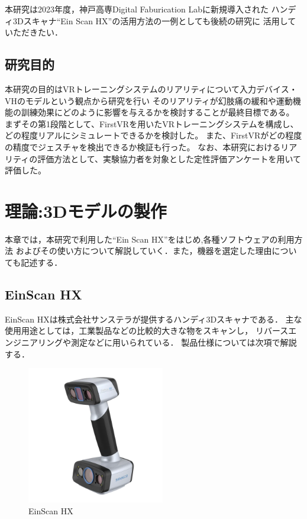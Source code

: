 \documentclass{ltjsreport}
\begin{document}
	本研究は2023年度，神戸高専Digital Faburication Labに新規導入された
	ハンディ3Dスキャナ``Ein Scan HX''\cite{ref:6}の活用方法の一例としても後続の研究に
	活用していただきたい．

	\section{研究目的}
	本研究の目的はVRトレーニングシステムのリアリティについて入力デバイス・VHのモデルという観点から研究を行い
	そのリアリティが幻肢痛の緩和や運動機能の訓練効果にどのように影響を与えるかを検討することが最終目標である。
	まずその第1段階として、FirstVRを用いたVRトレーニングシステムを構成し、どの程度リアルにシミュレートできるかを検討した。
	また、FirstVRがどの程度の精度でジェスチャを検出できるか検証も行った。
	なお、本研究におけるリアリティの評価方法として、実験協力者を対象とした定性評価アンケートを用いて評価した。

\chapter{理論:3Dモデルの製作}
	本章では，本研究で利用した``Ein Scan HX''をはじめ,各種ソフトウェアの利用方法
	およびその使い方について解説していく．また，機器を選定した理由についても記述する．

	\section{EinScan HX}
		EinScan HXは株式会社サンステラが提供するハンディ3Dスキャナである．
		主な使用用途としては，工業製品などの比較的大きな物をスキャンし，
		リバースエンジニアリングや測定などに用いられている．
		製品仕様については次項で解説する．

		\begin{figure}[H]
		\centering
		\includegraphics[width = 6cm]{../figs/EinScan.png}
		\caption{EinScan HX}
		\label{fig:EinScan}
		\end{figure}
\end{document}
